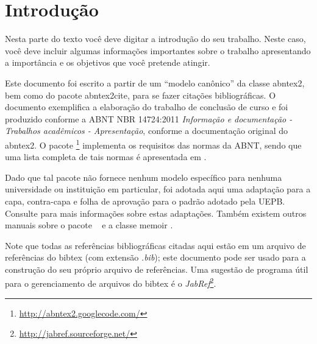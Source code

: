 \documentclass[12pt,oneside,a4paper,chapter=TITLE,english,brazil]{abntex2}
\begin{document}
\tableofcontents*
\cleardoublepage


\textual


\chapter{Introdução}
\label{introducao}

Nesta parte do texto você deve digitar a introdução do seu trabalho. Neste caso, você deve incluir algumas informações importantes sobre o trabalho apresentando a importância e os objetivos que você pretende atingir.

Este documento foi escrito a partir de um ``modelo canônico'' da classe \textsf{abntex2}, bem como do pacote \textsf{abntex2cite}, para se fazer citações bibliográficas. O documento exemplifica a elaboração do trabalho de conclusão de curso e foi produzido conforme a ABNT NBR 14724:2011 \emph{Informação e documentação - Trabalhos acadêmicos - Apresentação}, conforme a documentação original do \textsf{abntex2}. O pacote \abnTeX\footnote{\url{http://abntex2.googlecode.com/}} implementa os requisitos das normas da ABNT, sendo que uma lista completa de tais normas é apresentada em .

Dado que tal pacote não fornece nenhum modelo específico para nenhuma universidade ou instituição em particular, foi adotada aqui uma adaptação para a capa, contra-capa e folha de aprovação para o padrão adotado pela UEPB. Consulte  para mais informações sobre estas adaptações. Também existem outros manuais sobre o pacote \abnTeX\ \cite{abntex2classe,abntex2cite,abntex2cite-alf} e a classe \textsf{memoir} \cite{memoir}.

Note que todas as referências bibliográficas citadas aqui estão em um arquivo de referências do \textsf{bibtex} (com extensão \textit{.bib}); este documento pode ser usado para a construção do seu próprio arquivo de referências. Uma sugestão de programa útil para  o gerenciamento de arquivos do \textsf{bibtex} é o \textit{JabRef}\footnote{\url{http://jabref.sourceforge.net/}}.
\end{document}
